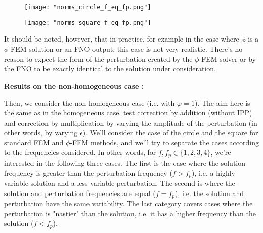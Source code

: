 \begin{itemize}
	\begin{minipage}{0.48\linewidth}
		\begin{figure}[H]
			\centering
			\texttt{[image: "norms\_circle\_f\_eq\_fp.png"]}
			\label{norms_circle_f_eq_fp}
		\end{figure} 
	\end{minipage}
	\begin{minipage}{0.48\linewidth}
		\begin{figure}[H]
			\centering
			\texttt{[image: "norms\_square\_f\_eq\_fp.png"]}
			\label{norms_square_f_eq_fp}
		\end{figure} 
	\end{minipage}
	\begin{Rem}
		It should be noted, however, that in practice, for example in the case where $\tilde{\phi}$ is a $\phi$-FEM solution or an FNO output, this case is not very realistic. There's no reason to expect the form of the perturbation created by the $\phi$-FEM solver or by the FNO to be exactly identical to the solution under consideration.
	\end{Rem}
\end{itemize}

\textbf{Results on the non-homogeneous case :}

Then, we consider the non-homogeneous case (i.e. with $\varphi=1$). The aim here is the same as in the homogeneous case, test correction by addition (without IPP) and correction by multiplication by varying the amplitude of the perturbation (in other words, by varying $\epsilon$). We'll consider the case of the circle and the square for standard FEM and $\phi$-FEM methods, and we'll try to separate the cases according to the frequencies considered. In other words, for $f,f_p\in\{1,2,3,4\}$, we're interested in the following three cases. The first is the case where the solution frequency is greater than the perturbation frequency ($f>f_p$), i.e. a highly variable solution and a less variable perturbation. The second is where the solution and perturbation frequencies are equal ($f=f_p$), i.e. the solution and perturbation have the same variability. The last category covers cases where the perturbation is "nastier" than the solution, i.e. it has a higher frequency than the solution ($f<f_p$).

